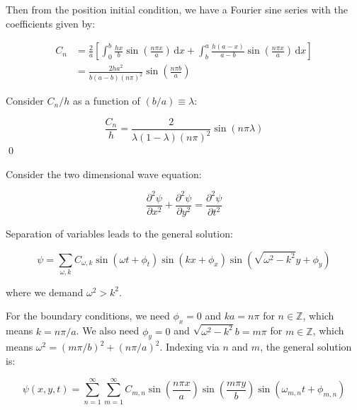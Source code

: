 \documentclass[12pt]{article}
\begin{document}
Then from the position initial condition, we have a Fourier sine series with the coefficients given by:

\begin{equation}
\begin{split}
    C_{n} &= \frac{2}{a} \left[ \int_{0}^{b} \frac{hx}{b} \sin{\left( \frac{n \pi x}{a} \right)} \, \mathrm{d}x + \int_{b}^{a} \frac{h(a-x)}{a-b} \sin{\left( \frac{n \pi x}{a} \right)} \, \mathrm{d}x \right] \\
    &= \frac{2ha^{2}}{b(a - b)(n\pi)^{2}} \sin{\left( \frac{n \pi b}{a} \right)}
\end{split}
\end{equation}

Consider $C_{n}/h$ as a function of $(b/a) \equiv \lambda$:

\begin{equation}
    \frac{C_{n}}{h} = \frac{2}{\lambda(1 - \lambda)(n\pi)^{2}} \sin{(n \pi \lambda)}
\end{equation}
\qed


Consider the two dimensional wave equation:

\begin{equation}
    \frac{\partial^{2} \psi}{\partial x^{2}} + \frac{\partial^{2} \psi}{\partial y^{2}} = \frac{\partial^{2} \psi}{\partial t^{2}}
\end{equation}

Separation of variables leads to the general solution:

\begin{equation}
    \psi = \sum_{\omega, k} C_{\omega, k} \sin{(\omega t + \phi_{t})} \sin{(k x + \phi_{x})} \sin{(\sqrt{\omega^{2} - k^{2}} y + \phi_{y})}
\end{equation}

where we demand $\omega^{2} > k^{2}$.

For the boundary conditions, we need $\phi_{x} = 0$ and $ka = n \pi$ for $n \in \mathbb{Z}$, which means $k = n \pi/a$. We also need $\phi_{y} = 0$ and $\sqrt{\omega^{2} - k^{2}} b = m \pi$ for $m \in \mathbb{Z}$, which means $\omega^{2} = (m \pi/b)^{2} + (n \pi/a)^{2}$. Indexing via $n$ and $m$, the general solution is:

\begin{equation}
    \psi(x, y, t) = \sum_{n = 1}^{\infty} \sum_{m = 1}^{\infty} C_{m, n} \sin{\left( \frac{n \pi x}{a} \right)} \sin{\left( \frac{m \pi y}{b} \right)} \sin{\left( \omega_{m, n} t + \phi_{m, n} \right)}
\end{equation}
\end{document}
